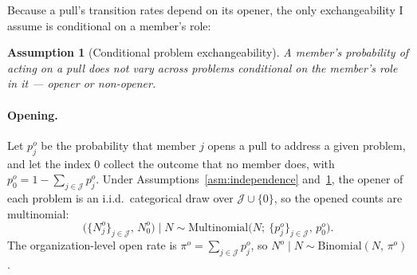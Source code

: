 \documentclass[12pt,notitlepage]{article}
\newtheorem{assumption}{Assumption}
\begin{document}
Because a pull's transition rates depend on its opener, the only exchangeability I assume is conditional on a member's role:
\begin{assumption}[Conditional problem exchangeability]
\label{asm:problem-invariant}
A member's probability of acting on a pull does not vary across problems conditional on the member's role in it --- opener or non-opener.
\end{assumption}

\paragraph{Opening.}
Let $p_j^o$ be the probability that member $j$ opens a pull to address a given problem, and let the index $0$ collect the outcome that no member does, with $p_0^o = 1 - \sum_{j\in\mathcal J} p_j^o$.
Under Assumptions~\ref{asm:independence} and~\ref{asm:problem-invariant}, the opener of each problem is an i.i.d.\ categorical draw over $\mathcal J\cup\{0\}$, so the opened counts are multinomial:
\[ \bigl(\{N_j^o\}_{j\in\mathcal J},\, N_0^o\bigr) \mid N \sim \text{Multinomial}\bigl(N;\ \{p_j^o\}_{j\in\mathcal J},\, p_0^o\bigr). \]
The organization-level open rate is $\pi^o = \sum_{j\in\mathcal J} p_j^o$, so $N^o \mid N \sim \text{Binomial}(N,\, \pi^o)$.
\end{document}
